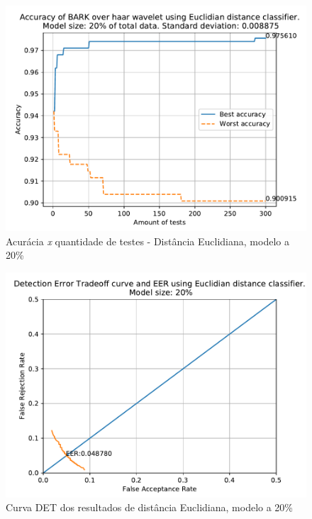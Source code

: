 			\begin{figure}[H]
				\centering
				\includegraphics[width=.9\linewidth]{images/results/confusionMatrices/classifier_Euclidian_20}
				\caption{Acurácia \textit{x} quantidade de testes - Distância Euclidiana, modelo a 20\%}
				\label{fig:classifiereuclidian20}
			\end{figure}
		
			\begin{figure}[H]
				\centering
				\includegraphics[width=.9\linewidth]{images/results/det/DET_for_classifier_Euclidian_20}
				\caption{Curva DET dos resultados de distância Euclidiana, modelo a 20\%}
				\label{fig:detforclassifiereuclidian20}
			\end{figure}

